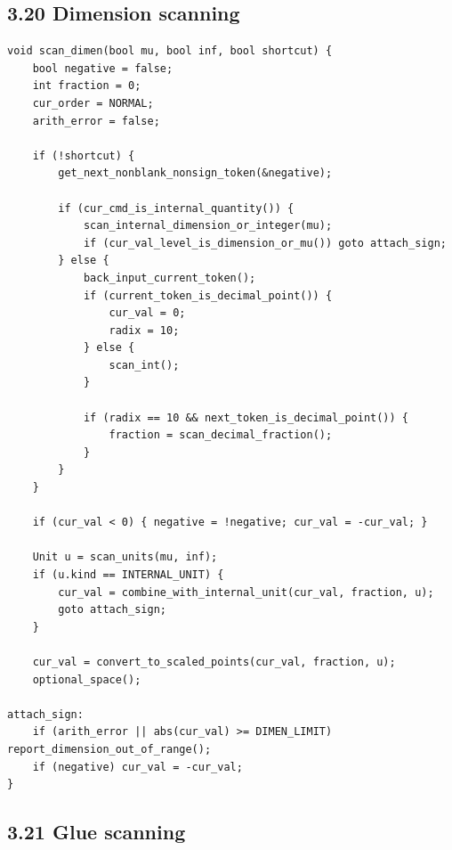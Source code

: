 \documentclass[11pt]{article}
\begin{document}
\subsection{3.20 Dimension scanning}\label{dimension-scanning}

\begin{verbatim}
void scan_dimen(bool mu, bool inf, bool shortcut) {
    bool negative = false;
    int fraction = 0;
    cur_order = NORMAL;
    arith_error = false;

    if (!shortcut) {
        get_next_nonblank_nonsign_token(&negative);

        if (cur_cmd_is_internal_quantity()) {
            scan_internal_dimension_or_integer(mu);
            if (cur_val_level_is_dimension_or_mu()) goto attach_sign;
        } else {
            back_input_current_token();
            if (current_token_is_decimal_point()) {
                cur_val = 0;
                radix = 10;
            } else {
                scan_int();
            }

            if (radix == 10 && next_token_is_decimal_point()) {
                fraction = scan_decimal_fraction();
            }
        }
    }

    if (cur_val < 0) { negative = !negative; cur_val = -cur_val; }

    Unit u = scan_units(mu, inf);
    if (u.kind == INTERNAL_UNIT) {
        cur_val = combine_with_internal_unit(cur_val, fraction, u);
        goto attach_sign;
    }

    cur_val = convert_to_scaled_points(cur_val, fraction, u);
    optional_space();

attach_sign:
    if (arith_error || abs(cur_val) >= DIMEN_LIMIT) report_dimension_out_of_range();
    if (negative) cur_val = -cur_val;
}
\end{verbatim}

\subsection{3.21 Glue scanning}\label{glue-scanning}
\end{document}
